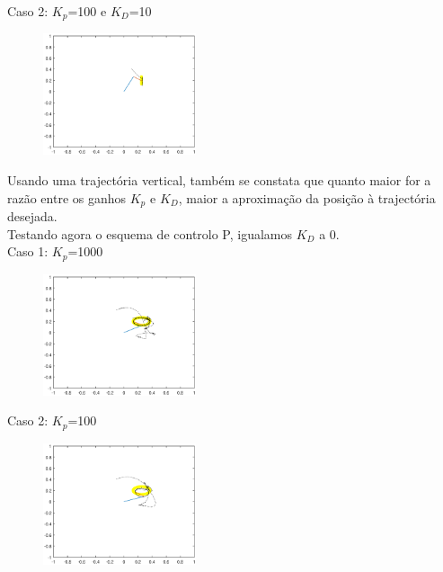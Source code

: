 \documentclass[a4paper,twocolumn,final,11pt]{article}
\begin{document}
Caso 2:  $K_p$=100 e $K_D$=10

\begin{figure}[H]
	\centering
	\includegraphics[width=0.4\textwidth]{7_vertical_pd_ganhos_100_10.eps}
	\caption{}
  \label{}
\end{figure}

Usando uma trajectória vertical, também se constata que quanto maior for a razão entre os ganhos $K_p$ e $K_D$, maior a aproximação da posição à trajectória desejada.
\\

Testando agora o esquema de controlo P, igualamos $K_D$ a 0.
\\

Caso 1: $K_p$=1000

\begin{figure}[H]
	\centering
	\includegraphics[width=0.4\textwidth]{7_p_ganho1000.eps}
	\caption{}
  \label{}
\end{figure}

Caso 2: $K_p$=100

\begin{figure}[H]
	\centering
	\includegraphics[width=0.4\textwidth]{7_p_ganho100.eps}
	\caption{}
  \label{}
\end{figure}
\end{document}
